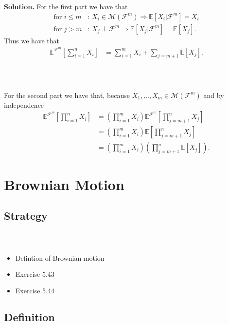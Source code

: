 \documentclass{beamer}
\numberwithin{equation}{section}
\newenvironment{frame2}{\begin{frame}\frametitle{{\normalsize \secname} \\ {\large \subsecname}}}{\end{frame}}
\begin{document}
\begin{frame2}
    \textbf{Solution.}
    For the first part we have that
    \begin{align}
        \text{for } i \leq m&: \ X_i \in \mathcal{M}(\mathcal{F}^m) \Rightarrow \mathbb{E}\left[X_i|\mathcal{F}^m\right] = X_i \\
        \text{for } j > m&: \ X_j \perp \mathcal{F}^m \Rightarrow \mathbb{E}\left[X_j|\mathcal{F}^m\right] = \mathbb{E}[X_j].
    \end{align}
    Thus we have that
    \begin{align}
        \mathbb{E}^{\mathcal{F}^m}\left[ \sum_{i = 1}^n X_i \right] &= \sum_{i=1}^m X_i + \sum_{j = m+1}\mathbb{E}\left[X_j\right].
    \end{align}
\end{frame2}

\begin{frame2}
    For the second part we have that, because $X_1,\ldots,X_m \in \mathcal{M}(\mathcal{F}^m)$ and by independence
    \begin{align}
        \mathbb{E}^{\mathcal{F}^m}\left[ \prod_{i = 1}^n X_i \right] &= \left(\prod_{i=1}^m X_i\right) \mathbb{E}^{\mathcal{F}^m}\left[\prod_{j=m+1}^n X_j\right] \\
        &= \left(\prod_{i=1}^m X_i\right) \mathbb{E}\left[\prod_{j=m+1}^n X_j\right] \\
        &= \left(\prod_{i=1}^m X_i\right)\left(\prod_{j=m+1}^n \mathbb{E}[X_j]\right).
    \end{align}
\end{frame2}

\section{Brownian Motion}

\subsection{Strategy}
\begin{frame2}
    \begin{itemize}
        \item Defintion of Brownian motion
        \item Exercise 5.43
        \item Exercise 5.44
    \end{itemize}
\end{frame2}

\subsection{Definition}
\end{document}
